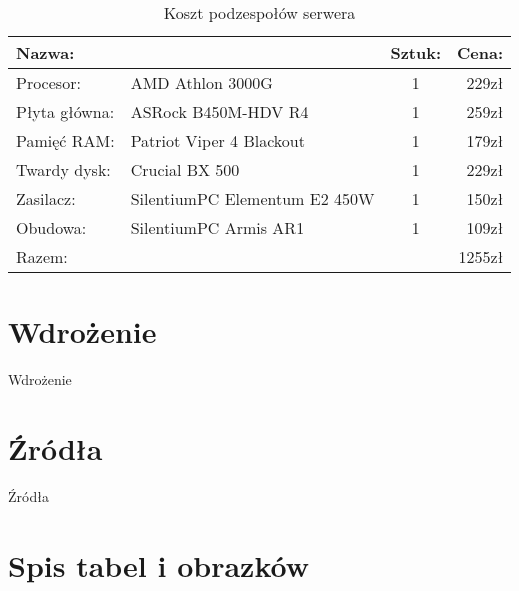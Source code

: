 \documentclass[12pt,a4paper]{article}
\begin{document}
		\begin{table}[!hbp]
			\center
			\begin{tabular}{|l|l|c|r|}
				\hline
				\multicolumn{2}{|l|}{Nazwa:} & Sztuk: & Cena: \\
				\hline
				Procesor: & AMD Athlon 3000G & 1 & 229zł \\
				\hline
				Płyta główna: & ASRock B450M-HDV R4 & 1 & 259zł \\
				\hline
				Pamięć RAM: & Patriot Viper 4 Blackout & 1 & 179zł \\
				\hline
				Twardy dysk: & Crucial BX 500 & 1 & 229zł \\
				\hline
				Zasilacz: & SilentiumPC Elementum E2 450W & 1 & 150zł \\
				\hline
				Obudowa: & SilentiumPC Armis AR1 & 1 & 109zł \\
				\hline
				\multicolumn{3}{|l|}{Razem:} & 1255zł \\
				\hline
			\end{tabular}
			\caption{Koszt podzespołów serwera}
			\label{Koszt podzespołów serwera}
		\end{table}
	
	\newpage
	
	\section{Wdrożenie}
		\indent Wdrożenie
	\newpage
	
	\section{Źródła}
		\indent Źródła
	\newpage
	
	\section{Spis tabel i obrazków}
		\listoftables
		\listoffigures
\end{document}
